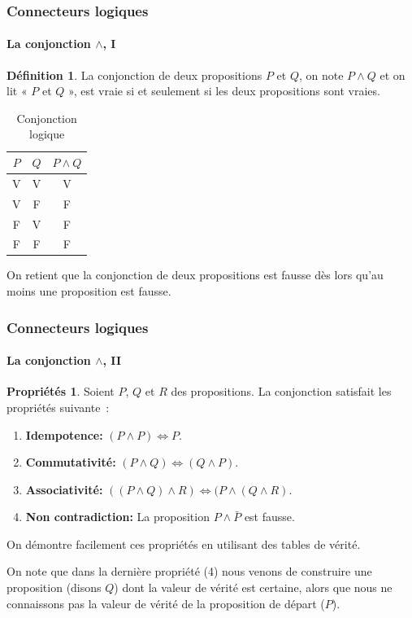 \documentclass[10pt,notheorems]{beamer}
\theoremstyle{plain}
\theoremstyle{definition} %
\newtheorem{definition}{Définition}
\newtheorem{properties}{Propriétés}
\begin{document}
  \begin{frame}
    \frametitle{Connecteurs logiques}
    \framesubtitle{La conjonction $\land$, I}

  \begin{definition}\label{def:conjonction}
    La conjonction de deux propositions $P$ et $Q$, on note $P\land Q$
    et on lit « $P$ et $Q$ », est vraie si et seulement si les
    deux propositions sont vraies.
  \end{definition}

  \bigskip

  \begin{table}[H]
    \centering
    \begin{tabular}[H]{|cc|c|}
      \hline
      $P$ & $Q$ & $P \land Q$\\ \hline
      V & V & V \\
      V & F & F \\
      F & V & F \\
      F & F & F \\
      \hline\hline
    \end{tabular}
    \caption{Conjonction logique}
    \label{tab:conjonction}
  \end{table}

  \bigskip

  On retient que la conjonction de deux propositions est fausse dès
  lors qu'au moins une proposition est fausse.

  \end{frame}

  \begin{frame}
    \frametitle{Connecteurs logiques}
    \framesubtitle{La conjonction $\land$, II}

  \begin{properties}\label{properties:conjonction}
    Soient $P$, $Q$ et $R$ des propositions. La conjonction satisfait
    les propriétés suivante :
    \begin{enumerate}
    \item \textbf{Idempotence:} $(P \land P) \Leftrightarrow P$.
    \item \textbf{Commutativité:}
      $(P \land Q) \Leftrightarrow (Q \land P)$.
    \item \textbf{Associativité:}
      $((P \land Q)\land R) \Leftrightarrow (P \land (Q\land R)$.
    \item \textbf{Non contradiction:} La proposition $P \land \bar P$
      est fausse.
    \end{enumerate}
  \end{properties}

  \bigskip

  On démontre facilement ces propriétés en utilisant des tables de
  vérité.\newline

  On note que dans la dernière propriété (4) nous venons de construire
  une proposition (disons $Q$) dont la valeur de vérité est certaine,
  alors que nous ne connaissons pas la valeur de vérité de la
  proposition de départ ($P$).

  \end{frame}
\end{document}
